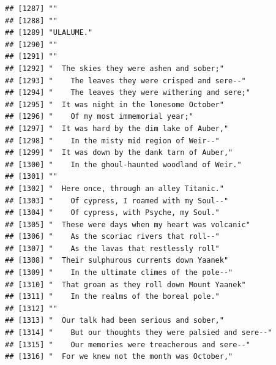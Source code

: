 \documentclass{article}\usepackage[]{graphicx}\usepackage[]{color}
\makeatletter
\newenvironment{kframe}{%
 \def\at@end@of@kframe{}%
 \ifinner\ifhmode%
  \def\at@end@of@kframe{\end{minipage}}%
  \begin{minipage}{\columnwidth}%
 \fi\fi%
 \def\FrameCommand##1{\hskip\@totalleftmargin \hskip-\fboxsep
 \colorbox{shadecolor}{##1}\hskip-\fboxsep
     \hskip-\linewidth \hskip-\@totalleftmargin \hskip\columnwidth}%
 \MakeFramed {\advance\hsize-\width
   \@totalleftmargin\z@ \linewidth\hsize
   \@setminipage}}%
 {\par\unskip\endMakeFramed%
 \at@end@of@kframe}
\newenvironment{knitrout}{}{} %
\makeatother
\begin{document}
\begin{knitrout}
\begin{kframe}
\begin{verbatim}
## [1287] ""                                                                            
## [1288] ""                                                                            
## [1289] "ULALUME."                                                                    
## [1290] ""                                                                            
## [1291] ""                                                                            
## [1292] "  The skies they were ashen and sober;"                                      
## [1293] "    The leaves they were crisped and sere--"                                 
## [1294] "    The leaves they were withering and sere;"                                
## [1295] "  It was night in the lonesome October"                                      
## [1296] "    Of my most immemorial year;"                                             
## [1297] "  It was hard by the dim lake of Auber,"                                     
## [1298] "    In the misty mid region of Weir--"                                       
## [1299] "  It was down by the dank tarn of Auber,"                                    
## [1300] "    In the ghoul-haunted woodland of Weir."                                  
## [1301] ""                                                                            
## [1302] "  Here once, through an alley Titanic."                                      
## [1303] "    Of cypress, I roamed with my Soul--"                                     
## [1304] "    Of cypress, with Psyche, my Soul."                                       
## [1305] "  These were days when my heart was volcanic"                                
## [1306] "    As the scoriac rivers that roll--"                                       
## [1307] "    As the lavas that restlessly roll"                                       
## [1308] "  Their sulphurous currents down Yaanek"                                     
## [1309] "    In the ultimate climes of the pole--"                                    
## [1310] "  That groan as they roll down Mount Yaanek"                                 
## [1311] "    In the realms of the boreal pole."                                       
## [1312] ""                                                                            
## [1313] "  Our talk had been serious and sober,"                                      
## [1314] "    But our thoughts they were palsied and sere--"                           
## [1315] "    Our memories were treacherous and sere--"                                
## [1316] "  For we knew not the month was October,"                                    

\end{verbatim}
\end{kframe}
\end{knitrout}
\end{document}

